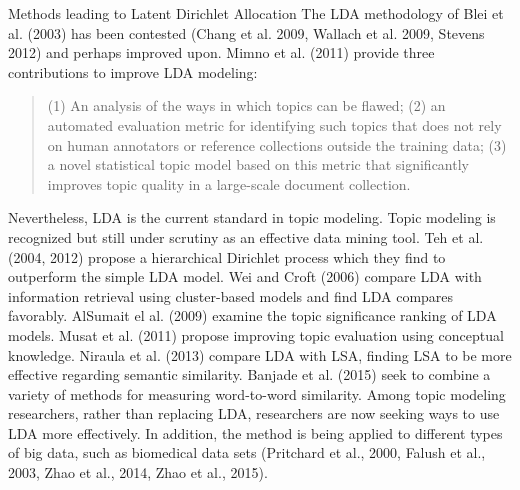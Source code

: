 \documentclass[11pt]{article}
\begin{document}
\begin{section}{Methods leading to Latent Dirichlet Allocation}
The LDA methodology of Blei et al. (2003) has been contested (Chang et al. 2009, Wallach et al. 2009, Stevens 2012) and perhaps improved upon. Mimno et al. (2011) provide three contributions to improve LDA modeling:
\begin{quote}
(1) An analysis of the ways in which topics can be flawed; (2) an automated evaluation metric for identifying such topics that does not rely on human annotators or reference collections outside the training data; (3) a novel statistical topic model based on this metric that significantly improves topic quality in a large-scale document collection.
\end{quote}

Nevertheless, LDA is the current standard in topic modeling. Topic modeling is recognized but still under scrutiny as an effective data mining tool. Teh et al. (2004, 2012) propose a hierarchical Dirichlet process which they find to outperform the simple LDA model. Wei and Croft (2006) compare LDA with information retrieval using cluster-based models and find LDA compares favorably. AlSumait el al. (2009) examine the topic significance ranking of LDA models. Musat et al. (2011) propose improving topic evaluation using conceptual knowledge. Niraula et al. (2013) compare LDA with LSA, finding LSA to be more effective regarding semantic similarity. Banjade et al. (2015) seek to combine a variety of methods for measuring word-to-word similarity. Among topic modeling researchers, rather than replacing LDA, researchers are now seeking ways to use LDA more effectively. In addition, the method is being applied to different types of big data, such as biomedical data sets (Pritchard et al., 2000, Falush et al., 2003, Zhao et al., 2014, Zhao et al., 2015).

\end{section}
\end{document}
